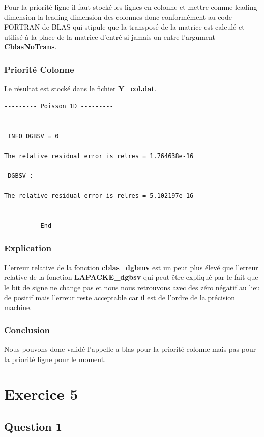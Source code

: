 \documentclass[11pt]{article}
\begin{document}
Pour la priorité ligne il faut stocké les lignes en colonne et mettre
comme leading dimension la leading dimension des colonnes donc
conformément au code FORTRAN de BLAS qui stipule que la transposé de
la matrice est calculé et utilisé à la place de la matrice d'entré si
jamais on entre l'argument \textbf{CblasNoTrans}.

\subsubsection{Priorité Colonne}

Le résultat est stocké dans le fichier \textbf{Y\_col.dat}.

\begin{lstlisting}
--------- Poisson 1D ---------


 INFO DGBSV = 0

The relative residual error is relres = 1.764638e-16

 DGBSV :

The relative residual error is relres = 5.102197e-16


--------- End -----------
\end{lstlisting}

\subsubsection{Explication}

L'erreur relative de la fonction \textbf{cblas\_dgbmv} est un peut
plus élevé que l'erreur relative de la fonction
\textbf{LAPACKE\_dgbsv} qui peut être expliqué par le fait que le bit
de signe ne change pas et nous nous retrouvons avec des zéro négatif
au lieu de positif mais l'erreur reste acceptable car il est de
l'ordre de la précision machine.

\subsubsection{Conclusion}

Nous pouvons donc validé l'appelle a blas pour la priorité colonne
mais pas pour la priorité ligne pour le moment.

\section{Exercice 5}

\subsection{Question 1}
\end{document}
